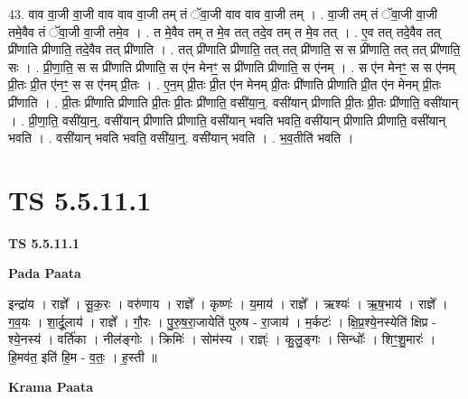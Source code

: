 \documentclass[17pt]{extarticle}
\begin{document}
43. वाव वा॒जी वा॒जी वाव वाव वा॒जी तम् तं ॅवा॒जी वाव वाव वा॒जी तम् । . वा॒जी तम् तं ॅवा॒जी वा॒जी तमे॒वैव तं ॅवा॒जी वा॒जी तमे॒व । . त मे॒वैव तम् त मे॒व तत् तदे॒व तम् त मे॒व तत् । . ए॒व तत् तदे॒वैव तत् प्री॑णाति प्रीणाति॒ तदे॒वैव तत् प्री॑णाति । . तत् प्री॑णाति प्रीणाति॒ तत् तत् प्री॑णाति॒ स स प्री॑णाति॒ तत् तत् प्री॑णाति॒ सः । . प्री॒णा॒ति॒ स स प्री॑णाति प्रीणाति॒ स ए॑न मेनꣳ॒॒ स प्री॑णाति प्रीणाति॒ स ए॑नम् । . स ए॑न मेनꣳ॒॒ स स ए॑नम् प्री॒तः प्री॒त ए॑नꣳ॒॒ स स ए॑नम् प्री॒तः । . ए॒न॒म् प्री॒तः प्री॒त ए॑न मेनम् प्री॒तः प्री॑णाति प्रीणाति प्री॒त ए॑न मेनम् प्री॒तः प्री॑णाति । . प्री॒तः प्री॑णाति प्रीणाति प्री॒तः प्री॒तः प्री॑णाति॒ वसी॑या॒न्॒. वसी॑यान् प्रीणाति प्री॒तः प्री॒तः प्री॑णाति॒ वसी॑यान् । . प्री॒णा॒ति॒ वसी॑या॒न्॒. वसी॑यान् प्रीणाति प्रीणाति॒ वसी॑यान् भवति भवति॒ वसी॑यान् प्रीणाति प्रीणाति॒ वसी॑यान् भवति । . वसी॑यान् भवति भवति॒ वसी॑या॒न्॒. वसी॑यान् भवति । . भ॒व॒तीति॑ भवति । \newline
\pagebreak
{}

\section{ TS 5.5.11.1 }

\textbf{TS 5.5.11.1 } \newline

\textbf{Pada Paata} \newline

इन्द्रा॑य । राज्ञे᳚ । सू॒क॒रः । वरु॑णाय । राज्ञे᳚ । कृष्णः॑ । य॒माय॑ । राज्ञे᳚ । ऋश्यः॑ । ऋ॒ष॒भाय॑ । राज्ञे᳚ । ग॒व॒यः । शा॒र्दू॒लाय॑ । राज्ञे᳚ । गौ॒रः । पु॒रु॒ष॒रा॒जायेति॑ पुरुष - रा॒जाय॑ । म॒र्कटः॑ । क्षि॒प्र॒श्ये॒नस्येति॑ क्षिप्र - श्ये॒नस्य॑ । वर्ति॑का । नील॑ङ्गोः । क्रिमिः॑ । सोम॑स्य । राज्ञ्ः॑ । कु॒लु॒ङ्गः । सिन्धोः᳚ । शिꣳ॒॒शु॒मारः॑ । हि॒मव॑त॒ इति॑ हि॒म - व॒तः॒ । ह॒स्ती ॥  \newline


\textbf{Krama Paata} \newline
\end{document}
